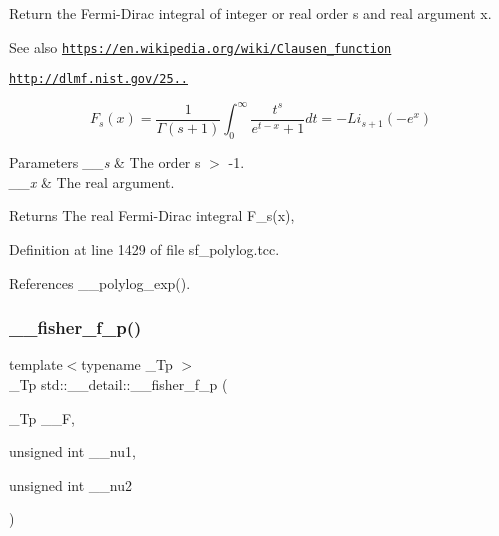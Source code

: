 Return the Fermi-\/\+Dirac integral of integer or real order s and real argument x. \begin{DoxySeeAlso}{See also}
\href{https://en.wikipedia.org/wiki/Clausen_function}{\tt https\+://en.\+wikipedia.\+org/wiki/\+Clausen\+\_\+function} 

\href{http://dlmf.nist.gov/25.12.16}{\tt http\+://dlmf.\+nist.\+gov/25..}
\end{DoxySeeAlso}
\[ F_s(x) = \frac{1}{\Gamma(s+1)}\int_0^\infty \frac{t^s}{e^{t-x} + 1}dt = -Li_{s+1}(-e^x) \]


\begin{DoxyParams}{Parameters}
{\em \+\_\+\+\_\+s} & The order s $>$ -\/1. \\
\hline
{\em \+\_\+\+\_\+x} & The real argument. \\
\hline
\end{DoxyParams}
\begin{DoxyReturn}{Returns}
The real Fermi-\/\+Dirac integral F\+\_\+s(x), 
\end{DoxyReturn}


Definition at line 1429 of file sf\+\_\+polylog.\+tcc.



References \+\_\+\+\_\+polylog\+\_\+exp().

\mbox{\label{namespacestd_1_1____detail_aee8f7c61fee93660eede2ed37cf58386}} 
\subsubsection{\texorpdfstring{\+\_\+\+\_\+fisher\+\_\+f\+\_\+p()}{\_\_fisher\_f\_p()}}
{\footnotesize\ttfamily template$<$typename \+\_\+\+Tp $>$ \\
\+\_\+\+Tp std\+::\+\_\+\+\_\+detail\+::\+\_\+\+\_\+fisher\+\_\+f\+\_\+p (\begin{DoxyParamCaption}\item[{\+\_\+\+Tp}]{\+\_\+\+\_\+F,  }\item[{unsigned int}]{\+\_\+\+\_\+nu1,  }\item[{unsigned int}]{\+\_\+\+\_\+nu2 }\end{DoxyParamCaption})}



